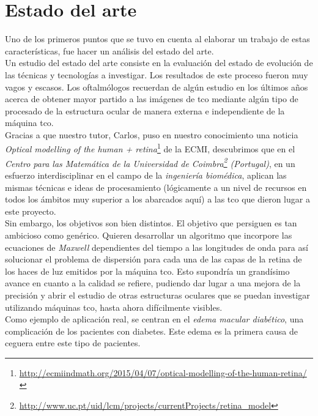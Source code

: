 \chapter{Estado del arte}
Uno de los primeros puntos que se tuvo en cuenta al elaborar un
trabajo de estas características, fue hacer un análisis del estado del arte.\\
Un estudio del estado del arte consiste en la evaluación del estado de
evolución de las técnicas y tecnologías a investigar. Los resultados
de este proceso fueron muy vagos y escasos. Los oftalmólogos recuerdan
de algún estudio en los últimos años acerca de obtener mayor partido a
las imágenes de \gls{tco} mediante algún tipo de procesado de la
estructura ocular de manera externa e independiente de la máquina \gls{tco}.\\
Gracias a que nuestro tutor, Carlos, puso en nuestro conocimiento una
noticia \emph{Optical modelling of the human +
  retina}\footnote{\url{http://ecmiindmath.org/2015/04/07/optical-modelling-of-the-human-retina/}}
de la \gls{ECMI}, descubrimos que en el \emph{Centro para las
  Matemática de la Universidad de
  Coimbra\footnote{\url{http://www.uc.pt/uid/lcm/projects/currentProjects/retina\_model}}
  (Portugal)}, en un esfuerzo interdisciplinar en el campo de la
\emph{ingeniería biomédica}, aplican las mismas técnicas e ideas de
procesamiento (lógicamente a un nivel de recursos en todos los ámbitos
muy superior a los abarcados aquí) a
las \gls{tco} que dieron lugar a este proyecto. \\
Sin embargo, los objetivos son bien distintos. El objetivo que
persiguen es tan ambicioso como genérico. Quieren desarrollar un
algoritmo que incorpore las ecuaciones de \emph{Maxwell} dependientes
del tiempo a las longitudes de onda para así solucionar el problema de
dispersión para cada una de las capas de la retina de los haces de luz
emitidos por la máquina \gls{tco}. Esto supondría un grandísimo avance
en cuanto a la calidad se refiere, pudiendo dar lugar a una mejora de
la precisión y abrir el estudio de otras estructuras oculares que se
puedan investigar utilizando máquinas \gls{tco}, hasta ahora
difícilmente
visibles.\\
Como ejemplo de aplicación real, se centran en el \emph{edema macular
  diabético}, una complicación de los pacientes con diabetes. Este
edema es la primera causa de ceguera entre este tipo de pacientes.
